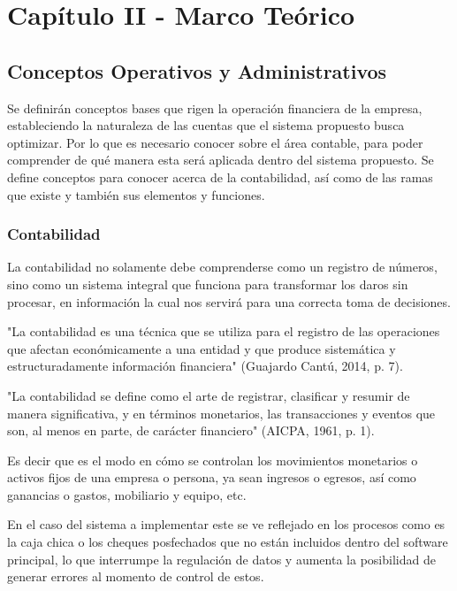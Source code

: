 
\section{Capítulo II - Marco Teórico}

\subsection{Conceptos Operativos y Administrativos}

Se definirán conceptos bases que rigen la operación financiera de la empresa, estableciendo la naturaleza de las cuentas que el sistema propuesto busca optimizar. Por lo que es necesario conocer sobre el área contable, para poder comprender de qué manera esta será aplicada dentro del sistema propuesto. Se define conceptos para conocer acerca de la contabilidad, así como de las ramas que existe y también sus elementos y funciones.

\subsubsection{Contabilidad}

La contabilidad no solamente debe comprenderse como un registro de números, sino como un sistema integral que funciona para transformar los daros sin procesar, en información la cual nos servirá para una correcta toma de decisiones.

"La contabilidad es una técnica que se utiliza para el registro de las operaciones que afectan económicamente a una entidad y que produce sistemática y estructuradamente información financiera" (Guajardo Cantú, 2014, p. 7).

"La contabilidad se define como el arte de registrar, clasificar y resumir de manera significativa, y en términos monetarios, las transacciones y eventos que son, al menos en parte, de carácter financiero" (AICPA, 1961, p. 1).

Es decir que es el modo en cómo se controlan los movimientos monetarios o activos fijos de una empresa o persona, ya sean ingresos o egresos, así como ganancias o gastos, mobiliario y equipo, etc.

En el caso del sistema a implementar este se ve reflejado en los procesos como es la caja chica o los cheques posfechados que no están incluidos dentro del software principal, lo que interrumpe la regulación de datos y aumenta la posibilidad de generar errores al momento de control de estos.

